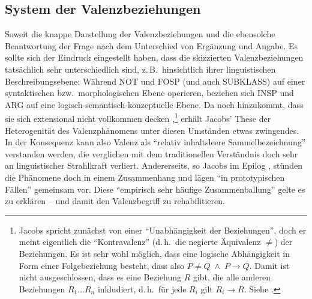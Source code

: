 
\subsection{System der Valenzbeziehungen} \label{sec:valenz:system}

Soweit die knappe Darstellung der Valenzbeziehungen und die ebensolche Beantwortung der Frage nach dem Unterschied von Ergänzung und Angabe. Es sollte sich der Eindruck eingestellt haben, dass die skizzierten Valenzbeziehungen tatsächlich sehr unterschiedlich sind, z.\,B.\ hinsichtlich ihrer linguistischen Beschreibungsebene: Während NOT und FOSP (und auch SUBKLASS) auf einer syntaktischen bzw.\ morphologischen Ebene operieren, beziehen sich INSP und ARG auf eine logisch-semantisch-konzeptuelle Ebene. Da noch hinzukommt, dass sie sich extensional nicht vollkommen decken \citep[Kapitel~5]{Jacobs:94},\footnote{Jacobs spricht zunächst von einer "`Unabhängigkeit der Beziehungen"', doch er meint eigentlich die "`Kontravalenz"' (d.\,h.\ die negierte Äquivalenz $\neq$) der Beziehungen. Es ist sehr wohl möglich, dass eine logische Abhängigkeit in Form einer Folgebeziehung besteht, dass also $P \neq Q \; \wedge \; P \to Q$. Damit ist nicht ausgeschlossen, dass es eine Beziehung $R$ gibt, die alle anderen Beziehungen $R_1 \ldots R_n$ inkludiert, d.\,h.\ für jede $R_i$ gilt $R_i \to R$. Siehe \cite[52, 64]{Jacobs:94}.} erhält Jacobs' These der Heterogenität des Valenzphänomens unter diesen Umständen etwas zwingendes.  In der Konsequenz kann also Valenz als "`relativ inhaltsleere Sammelbezeichnung"' \citep[55]{Jacobs:94} verstanden werden, die verglichen mit dem traditionellen Verständnis doch sehr an linguistischer Strahlkraft verliert. Andererseits, so Jacobs im Epilog \citep[71]{Jacobs:94}, stünden die Phänomene doch in einem Zusammenhang und lägen "`in prototypischen Fällen"' gemeinsam vor. Diese "`empirisch sehr häufige Zusammenballung"' gelte es zu erklären -- und damit den Valenzbegriff zu rehabilitieren. 


